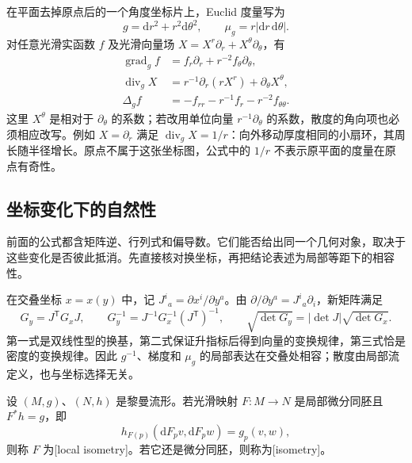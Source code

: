 \begin{example}
	\label{g3:exm:polar-metric-operators}
	在平面去掉原点后的一个角度坐标片上，Euclid 度量写为
	\[
		g=\mathrm{d}r^2+r^2\mathrm{d}\theta^2,\qquad
		\mu_g=r|\mathrm{d}r\,\mathrm{d}\theta|.
	\]
	对任意光滑实函数 \(f\) 及光滑向量场 \(X=X^r\partial_r+X^\theta\partial_\theta\)，有
	\[
		\begin{aligned}
			\operatorname{grad}_g f
			&=f_r\partial_r+r^{-2}f_\theta\partial_\theta,\\
			\operatorname{div}_g X
			&=r^{-1}\partial_r(rX^r)+\partial_\theta X^\theta,\\
			\Delta_g f
			&=-f_{rr}-r^{-1}f_r-r^{-2}f_{\theta\theta}.
		\end{aligned}
	\]
	这里 \(X^\theta\) 是相对于 \(\partial_\theta\) 的系数；若改用单位向量 \(r^{-1}\partial_\theta\) 的系数，散度的角向项也必须相应改写。例如 \(X=\partial_r\) 满足 \(\operatorname{div}_gX=1/r\)：向外移动厚度相同的小扇环，其周长随半径增长。原点不属于这张坐标图，公式中的 \(1/r\) 不表示原平面的度量在原点有奇性。
\end{example}

\subsection{坐标变化下的自然性}
\label{g3:subsec:0101:04}

前面的公式都含矩阵逆、行列式和偏导数。它们能否给出同一个几何对象，取决于这些变化是否彼此抵消。先直接核对换坐标，再把结论表述为局部等距下的相容性。

\ProseParagraphBreak

在交叠坐标 \(x=x(y)\) 中，记 \(J^i{}_a=\partial x^i/\partial y^a\)。由 \(\partial/\partial y^a=J^i{}_a\partial_i\)，新矩阵满足
\begin{equation}
	\label{g3:eq:metric-coordinate-transformation}
	G_y=J^{\mathsf T}G_xJ,\qquad
	G_y^{-1}=J^{-1}G_x^{-1}(J^{\mathsf T})^{-1},\qquad
	\sqrt{\det G_y}=|\det J|\sqrt{\det G_x}.
\end{equation}
第一式是双线性型的换基，第二式保证升指标后得到向量的变换规律，第三式恰是密度的变换规律。因此 \(g^{-1}\)、梯度和 \(\mu_g\) 的局部表达在交叠处相容；散度由局部流定义，也与坐标选择无关。

\begin{definition}
	\label{g3:def:local-isometry}
	设 \((M,g)\)、\((N,h)\) 是黎曼流形。若光滑映射 \(F:M\to N\) 是局部微分同胚且 \(F^*h=g\)，即
	\[
		h_{F(p)}(\mathrm{d}F_pv,\mathrm{d}F_pw)=g_p(v,w),
	\]
	则称 \(F\) 为[local isometry]。若它还是微分同胚，则称为[isometry]。
\end{definition}


